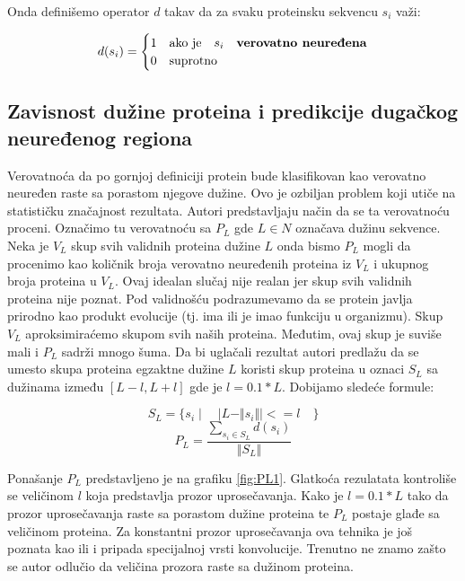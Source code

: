 Onda definišemo operator $d$ takav da za svaku proteinsku sekvencu $s_i$ važi:


\[   
  d(s_i) = 
    \begin{cases}
      1 & \text{ako je} \quad s_i \quad \textbf{verovatno neuređena}\\
      0 & \text{suprotno}
    \end{cases}
\]


\subsection{Zavisnost dužine proteina i predikcije dugačkog neuređenog regiona}

Verovatnoća da po gornjoj definiciji protein bude klasifikovan kao verovatno
neuređen raste sa porastom njegove dužine. Ovo je ozbiljan problem koji utiče
na statističku značajnost rezultata. Autori \parencite{Xie2007} predstavljaju način
da se ta verovatnoću proceni.
Označimo tu verovatnoću sa $P_L$ gde $L \in N$ označava dužinu sekvence. Neka
je $V_L$ skup svih validnih proteina dužine $L$ onda bismo $P_L$ mogli da
procenimo kao količnik broja verovatno neuređenih proteina iz $V_L$ i ukupnog
broja proteina u $V_L$. Ovaj idealan slučaj nije realan jer skup svih
validnih proteina nije poznat. Pod validnošću podrazumevamo da se protein
javlja prirodno kao produkt evolucije (tj. ima ili je imao funkciju u
organizmu). Skup $V_L$ aproksimiraćemo  skupom svih naših proteina. Međutim,
ovaj skup je suviše mali i $P_L$ sadrži mnogo šuma. Da bi uglačali rezultat
autori \cite{Xie2007} predlažu da se umesto skupa proteina egzaktne dužine $L$
koristi skup  proteina u oznaci $S_L$ sa dužinama između $[L-l, L+l]$ gde je $l
= 0.1*L$. Dobijamo sledeće formule:

$$ S_L = \{s_i \mid \quad | L -  \Vert s_i \Vert | <= l \quad   \}$$
$$ P_L = \dfrac{ \sum_{s_i \in S_L} d(s_i)} {\Vert S_L \Vert}$$

Ponašanje $P_L$ predstavljeno je na grafiku \ref{fig:PL1}. Glatkoća rezulatata
kontroliše se veličinom $l$ koja predstavlja prozor uprosečavanja. Kako je $l =
0.1*L$ tako da prozor uprosečavanja raste sa porastom dužine proteina te $P_L$
postaje glađe sa veličinom proteina. Za konstantni prozor uprosečavanja ova
tehnika je još poznata kao  ili  i
pripada specijalnoj vrsti konvolucije. Trenutno ne znamo zašto se autor odlučio
da veličina prozora raste sa dužinom proteina.


